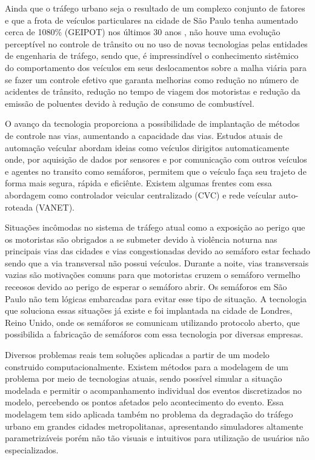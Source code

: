 \documentclass[
	12pt,					%
	openright,		%
	oneside,			%
	a4paper,			%
	english,			%
	french,				%
	spanish,			%
	brazil,				%
	]{abntex2}
\begin{document}
Ainda que o tráfego urbano seja o resultado de um complexo conjunto de fatores e que a frota de veículos particulares na cidade de São Paulo tenha aumentado cerca de 1080\% (GEIPOT) nos últimos 30 anos \cite{serra2004aplicaccoes}, não houve uma evolução perceptível no controle de trânsito ou no uso de novas tecnologias pelas entidades de engenharia de tráfego, sendo que, é impressindível o conhecimento sistêmico do comportamento dos veículos em seus deslocamentos sobre a malha viária para se fazer um controle efetivo que garanta melhorias como redução no número de acidentes de trânsito, redução no tempo de viagem dos motoristas e redução da emissão de poluentes devido à redução de consumo de combustível.

O avanço da tecnologia proporciona a possibilidade de implantação de métodos de controle nas vias, aumentando a capacidade das vias. Estudos atuais de automação veícular abordam ideias como veículos dirigitos automaticamente onde, por aquisição de dados por sensores e por comunicação com outros veículos e agentes no transito como semáforos, permitem que o veículo faça seu trajeto de forma mais segura, rápida e eficiênte. Existem algumas frentes com essa abordagem como controlador veicular centralizado (CVC) e rede veícular auto-roteada (VANET).

Situações incômodas no sistema de tráfego atual como a exposição ao perigo que os motoristas são obrigados a se submeter devido à violência noturna nas principais vias das cidades e vias congestionadas devido ao semáforo estar fechado sendo que a via transversal não possui veículos. Durante a noite, vias transversais vazias são motivações comuns para que motoristas cruzem o semáforo vermelho receosos devido ao perigo de esperar o semáforo abrir. Os semáforos em São Paulo não tem lógicas embarcadas para evitar esse tipo de situação. A tecnologia que soluciona essas situações já existe e foi implantada na cidade de Londres, Reino Unido, onde os semáforos se comunicam utilizando protocolo aberto, que possibilida a fabricação de semáforos com essa tecnologia por diversas empresas.

Diversos problemas reais tem soluções aplicadas a partir de um modelo \nocite{silveira2012universidade}  construido computacionalmente. Existem métodos para a modelagem de um problema por meio de tecnologias atuais, sendo possível simular a situação modelada e permitir o acompanhamento individual dos eventos discretizados no modelo, percebendo os pontos afetados pelo acontecimento do evento. Essa modelagem tem sido aplicada também no problema da degradação do tráfego urbano em grandes cidades metropolitanas, apresentando simuladores altamente parametrizáveis porém não tão visuais e intuitivos para utilização de usuários não especializados. 
\end{document}
